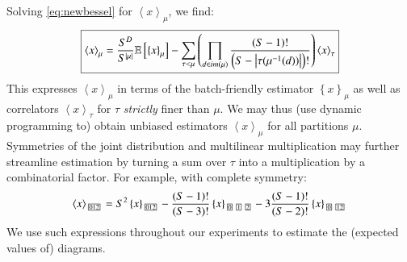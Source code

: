 \documentclass{article}
\newcommand{\expct}[1]{\mathbb{E}\left[#1\right]}
\newcommand{\wrap}[1]{\left(#1\right)}
\newcommand{\wang}[1]{\left\langle#1\right\rangle}
\newcommand{\wabs}[1]{\left|#1\right|}
\newcommand{\wurl}[1]{\left\{#1\right\}}
\newcommand{\partbox}[1]{
    \text{
        \fboxsep=0.5pt
        \tiny
        \fbox{#1}
    }
}
\begin{document}
    Solving \ref{eq:newbessel} for $\wang{x}_\mu$, we find:
    \begin{equation*}
        \text{\fbox{$
        \wang{x}_\mu
        =
        \frac{S^D}{S^{\wabs{\mu}}}
        \expct{
            \wurl{x}_\mu
        }
        -
        \sum_{\tau < \mu} \wrap{
            \prod_{d\in im(\mu)}
            \frac{\wrap{S-1}!}{\wrap{S-\wabs{\tau(\mu^{-1}(d))}}!}
        }
        \wang{x}_\tau
        $}}
    \end{equation*}
    This expresses $\wang{x}_\mu$ in terms of the batch-friendly estimator
    $\wurl{x}_\mu$ as well as correlators $\wang{x}_\tau$ for $\tau$ 
    \emph{strictly} finer than $\mu$.  We may thus (use dynamic programming to)
    obtain unbiased estimators $\wang{x}_\mu$ for all partitions $\mu$. 
    Symmetries of the joint distribution and multilinear multiplication may
    further streamline estimation by turning a sum over $\tau$ into a
    multiplication by a combinatorial factor.  For example, with complete
    symmetry:
    $$
        \wang{x}_{\partbox{012}}
        =
        S^2
        \wurl{x}_{\partbox{012}}
        -
        \frac{(S-1)!}{(S-3)!}
        \wurl{x}_{\partbox{0}\partbox{1}\partbox{2}}
        -
        3\frac{(S-1)!}{(S-2)!}
        \wurl{x}_{\partbox{0}\partbox{12}}
    $$
    We use such expressions throughout our experiments to estimate the
    (expected values of) diagrams.
\end{document}

